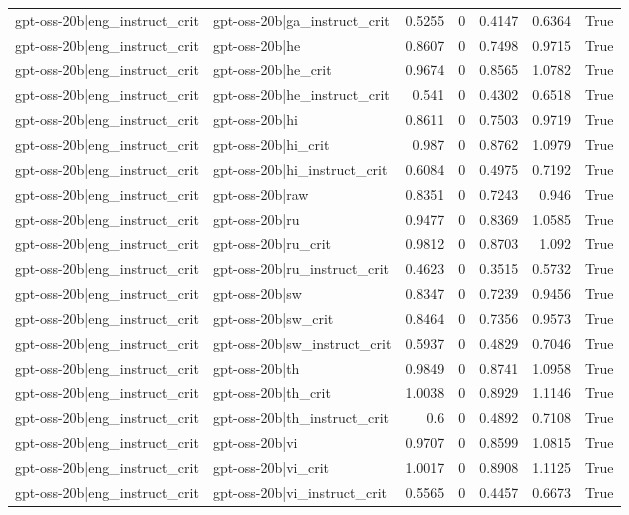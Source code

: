 \begin{table}
\begin{tabular}{l l r r r r l}
gpt-oss-20b|eng_instruct_crit & gpt-oss-20b|ga_instruct_crit & 0.5255 & 0 & 0.4147 & 0.6364 & True \\
gpt-oss-20b|eng_instruct_crit & gpt-oss-20b|he & 0.8607 & 0 & 0.7498 & 0.9715 & True \\
gpt-oss-20b|eng_instruct_crit & gpt-oss-20b|he_crit & 0.9674 & 0 & 0.8565 & 1.0782 & True \\
gpt-oss-20b|eng_instruct_crit & gpt-oss-20b|he_instruct_crit & 0.541 & 0 & 0.4302 & 0.6518 & True \\
gpt-oss-20b|eng_instruct_crit & gpt-oss-20b|hi & 0.8611 & 0 & 0.7503 & 0.9719 & True \\
gpt-oss-20b|eng_instruct_crit & gpt-oss-20b|hi_crit & 0.987 & 0 & 0.8762 & 1.0979 & True \\
gpt-oss-20b|eng_instruct_crit & gpt-oss-20b|hi_instruct_crit & 0.6084 & 0 & 0.4975 & 0.7192 & True \\
gpt-oss-20b|eng_instruct_crit & gpt-oss-20b|raw & 0.8351 & 0 & 0.7243 & 0.946 & True \\
gpt-oss-20b|eng_instruct_crit & gpt-oss-20b|ru & 0.9477 & 0 & 0.8369 & 1.0585 & True \\
gpt-oss-20b|eng_instruct_crit & gpt-oss-20b|ru_crit & 0.9812 & 0 & 0.8703 & 1.092 & True \\
gpt-oss-20b|eng_instruct_crit & gpt-oss-20b|ru_instruct_crit & 0.4623 & 0 & 0.3515 & 0.5732 & True \\
gpt-oss-20b|eng_instruct_crit & gpt-oss-20b|sw & 0.8347 & 0 & 0.7239 & 0.9456 & True \\
gpt-oss-20b|eng_instruct_crit & gpt-oss-20b|sw_crit & 0.8464 & 0 & 0.7356 & 0.9573 & True \\
gpt-oss-20b|eng_instruct_crit & gpt-oss-20b|sw_instruct_crit & 0.5937 & 0 & 0.4829 & 0.7046 & True \\
gpt-oss-20b|eng_instruct_crit & gpt-oss-20b|th & 0.9849 & 0 & 0.8741 & 1.0958 & True \\
gpt-oss-20b|eng_instruct_crit & gpt-oss-20b|th_crit & 1.0038 & 0 & 0.8929 & 1.1146 & True \\
gpt-oss-20b|eng_instruct_crit & gpt-oss-20b|th_instruct_crit & 0.6 & 0 & 0.4892 & 0.7108 & True \\
gpt-oss-20b|eng_instruct_crit & gpt-oss-20b|vi & 0.9707 & 0 & 0.8599 & 1.0815 & True \\
gpt-oss-20b|eng_instruct_crit & gpt-oss-20b|vi_crit & 1.0017 & 0 & 0.8908 & 1.1125 & True \\
gpt-oss-20b|eng_instruct_crit & gpt-oss-20b|vi_instruct_crit & 0.5565 & 0 & 0.4457 & 0.6673 & True \\

\end{tabular}
\end{table}
